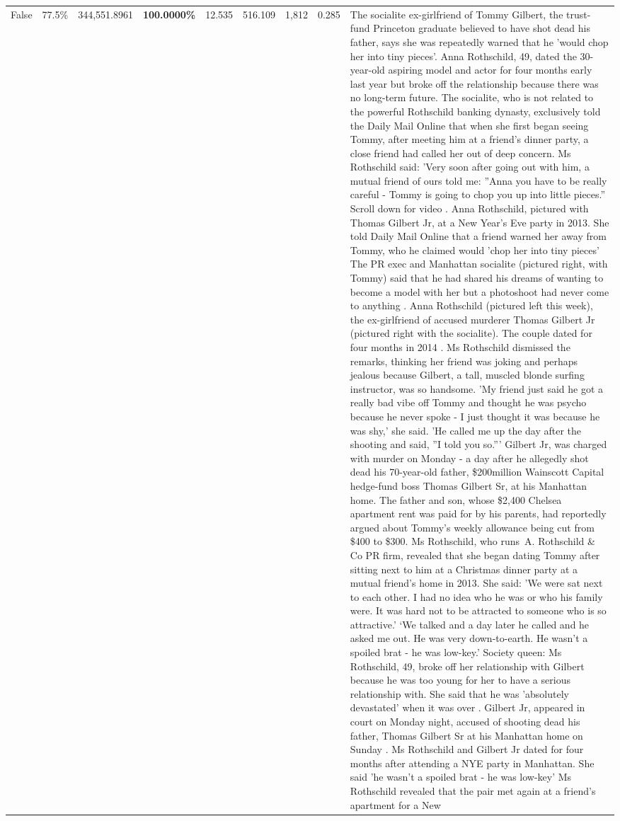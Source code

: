 \begin{table}[H]
\begin{tabular}{lllrlllll}
False & 77.5\% & 344,551.8961 & \bfseries \color{red} 100.0000\% & 12.535 & 516.109 & 1,812 & 0.285 & The socialite ex-girlfriend of Tommy Gilbert, the trust-fund Princeton graduate believed to have shot dead his father, says she was repeatedly warned that he 'would chop her into tiny pieces'. Anna Rothschild, 49, dated the 30-year-old aspiring model and actor for four months early last year but broke off the relationship because there was no long-term future. The socialite, who is not related to the powerful Rothschild banking dynasty, exclusively told the Daily Mail Online that when she first began seeing Tommy, after meeting him at a friend's dinner party, a close friend had called her out of deep concern. Ms Rothschild said: 'Very soon after going out with him, a mutual friend of ours told me: ''Anna you have to be really careful - Tommy is going to chop you up into little pieces.'' Scroll down for video . Anna Rothschild, pictured with Thomas Gilbert Jr, at a New Year's Eve party in 2013. She told Daily Mail Online that a friend warned her away from Tommy, who he claimed would 'chop her into tiny pieces' The PR exec and Manhattan socialite (pictured right, with Tommy) said that he had shared his dreams of wanting to become a model with her but a photoshoot had never come to anything . Anna Rothschild (pictured left this week), the ex-girlfriend of accused murderer Thomas Gilbert Jr (pictured right with the socialite). The couple dated for four months in 2014 . Ms Rothschild dismissed the remarks, thinking her friend was joking and perhaps jealous because Gilbert, a tall, muscled blonde surfing instructor, was so handsome. 'My friend just said he got a really bad vibe off Tommy and thought he was psycho because he never spoke - I just thought it was because he was shy,' she said. 'He called me up the day after the shooting and said, ''I told you so.''' Gilbert Jr, was charged with murder on Monday - a day after he allegedly shot dead his 70-year-old father, \$200million Wainscott Capital hedge-fund boss Thomas Gilbert Sr, at his Manhattan home. The father and son, whose \$2,400 Chelsea apartment rent was paid for by his parents, had reportedly argued about Tommy's weekly allowance being cut from \$400 to \$300. Ms Rothschild, who runs A. Rothschild \& Co PR firm, revealed that she began dating Tommy after sitting next to him at a Christmas dinner party at a mutual friend's home in 2013. She said: 'We were sat next to each other. I had no idea who he was or who his family were. It was hard not to be attracted to someone who is so attractive.' ‘We talked and a day later he called and he asked me out. He was very down-to-earth. He wasn’t a spoiled brat - he was low-key.’ Society queen: Ms Rothschild, 49, broke off her relationship with Gilbert because he was too young for her to have a serious relationship with. She said that he was 'absolutely devastated' when it was over . Gilbert Jr, appeared in court on Monday night, accused of shooting dead his father, Thomas Gilbert Sr at his Manhattan home on Sunday . Ms Rothschild and Gilbert Jr dated for four months after attending a NYE party in Manhattan. She said 'he wasn't a spoiled brat - he was low-key' Ms Rothschild revealed that the pair met again at a friend’s apartment for a New 
\end{tabular}
\end{table}
